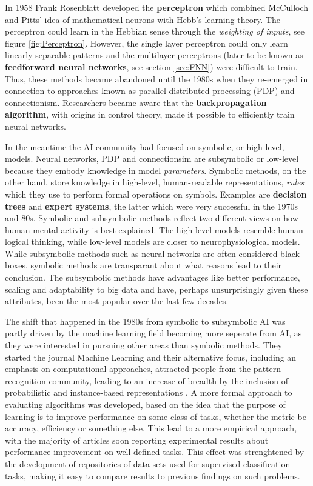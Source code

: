 \documentclass[twoside,english]{uiofysmaster}
\begin{document}
In 1958 Frank Rosenblatt developed the \textbf{perceptron} which combined McCulloch and Pitts' idea of mathematical neurons with Hebb's learning theory. The perceptron could learn in the Hebbian sense through the \textit{weighting of inputs}, see figure \ref{fig:Perceptron}. However, the single layer perceptron could only learn linearly separable patterns and the multilayer perceptrons (later to be known as \textbf{feedforward neural networks}, see section \ref{sec:FNN}) were difficult to train. Thus, these methods became abandoned until the 1980s when they re-emerged in connection to approaches known as parallel distributed processing (PDP) and connectionism. Researchers became aware that the \textbf{backpropagation algorithm}, with origins in control theory, made it possible to efficiently train neural networks. 


In the meantime the AI community had focused on symbolic, or high-level, models. Neural networks, PDP and connectionsim are subsymbolic or low-level because they embody knowledge in model \textit{parameters}. Symbolic methods, on the other hand, store knowledge in high-level, human-readable representations, \textit{rules} which they use to perform formal operations on symbols. Examples are \textbf{decision trees} and \textbf{expert systems}, the latter which were very successful in the 1970s and 80s.
Symbolic and subsymbolic methods reflect two different views on how human mental activity is best explained. The high-level models resemble human logical thinking, while low-level models are closer to neurophysiological models.
While subsymbolic methods such as neural networks are often considered black-boxes, symbolic methods are transparant about what reasons lead to their conclusion. The subsymbolic methods have advantages like better performance, scaling and adaptability to big data and have, perhaps unsurprisingly given these attributes, been the most popular over the last few decades.

The shift that happened in the 1980s from symbolic to subsymbolic AI was partly driven by the machine learning field becoming more seperate from AI, as they were interested in pursuing other areas than symbolic methods. They started the journal Machine Learning and their alternative focus, including an emphasis on computational approaches, attracted people from the pattern recognition community,  leading to an increase of breadth by the inclusion of probabilistic and instance-based representations \cite{Langley2011}. A more formal approach to evaluating algorithms was developed, based on the idea that the purpose of learning is to improve performance on some class of tasks, whether the metric be accuracy, efficiency or something else. This lead to a more empirical approach, with the majority of articles soon reporting experimental results about performance improvement on well-defined tasks. This effect was strenghtened by the development of repositories of data sets used for supervised classification tasks, making it easy to compare results to previous findings on such problems.
\end{document}
